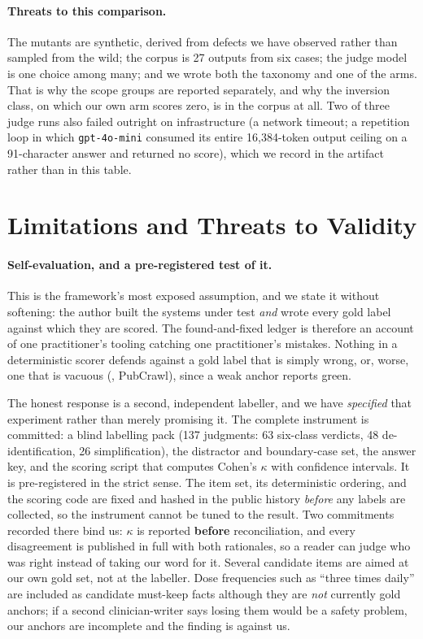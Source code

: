 \documentclass[11pt,a4paper]{article}
\begin{document}
\paragraph{Threats to this comparison.}
The mutants are synthetic, derived from defects we have observed rather than sampled from the wild;
the corpus is 27 outputs from six cases; the judge model is one choice among many; and we wrote both
the taxonomy and one of the arms. That is why the scope groups are reported separately, and why the
inversion class, on which our own arm scores zero, is in the corpus at all. Two of three judge runs
also failed outright on infrastructure (a network timeout; a repetition loop in which
\texttt{gpt-4o-mini} consumed its entire 16{,}384-token output ceiling on a 91-character answer and
returned no score), which we record in the artifact rather than in this table.

\section{Limitations and Threats to Validity}
\label{sec:limits}

\paragraph{Self-evaluation, and a pre-registered test of it.}
This is the framework's most exposed assumption, and we state it without softening: the author built
the systems under test \emph{and} wrote every gold label against which they are scored. The
found-and-fixed ledger is therefore an account of one practitioner's tooling catching one
practitioner's mistakes. Nothing in a deterministic scorer defends against a gold label that is simply
wrong, or, worse, one that is vacuous (, PubCrawl), since a weak anchor reports
green.

The honest response is a second, independent labeller, and we have \emph{specified} that experiment
rather than merely promising it. The complete instrument is committed: a blind labelling pack (137
judgments: 63 six-class verdicts, 48 de-identification, 26 simplification), the distractor and
boundary-case set, the answer key, and the scoring script that computes Cohen's $\kappa$ with
confidence intervals. It is pre-registered in the strict sense. The item set, its deterministic
ordering, and the scoring code are fixed and hashed in the public history \emph{before} any labels are
collected, so the instrument cannot be tuned to the result. Two commitments recorded there bind us:
$\kappa$ is reported \textbf{before} reconciliation, and every disagreement is published in full with
both rationales, so a reader can judge who was right instead of taking our word for it. Several
candidate items are aimed at our own gold set, not at the labeller. Dose frequencies such as ``three
times daily'' are included as candidate must-keep facts although they are \emph{not} currently gold
anchors; if a second clinician-writer says losing them would be a safety problem, our anchors are
incomplete and the finding is against us.
\end{document}

